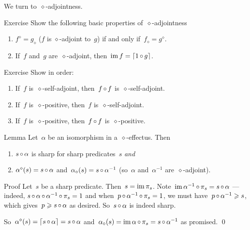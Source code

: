\documentclass[b]{subfiles}
\begin{document}
\begin{parsec}%
\begin{point}%
We turn to~$\diamond$-adjointness.
\end{point}
\begin{point}{Exercise}%
Show the following basic properties of~$\diamond$-adjointness
\begin{enumerate}
    \item
$f^\diamond = g_\diamond$
    ($f$ is $\diamond$-adjoint to~$g$)
    if and only if~$f_\diamond = g^\diamond$.
    \item
If~$f$ and~$g$ are~$\diamond$-adjoint,
    then~$\operatorname{im} f = \left\lceil1 \mathop{\circ} g\right\rceil$.
\end{enumerate}
\end{point}
\begin{point}{Exercise}%
Show in order:
\begin{enumerate}
\item
If~$f$ is~$\diamond$-self-adjoint,
    then~$f \mathop{\circ} f$ is~$\diamond$-self-adjoint.
\item
If~$f$ is~$\diamond$-positive,
    then~$f$ is~$\diamond$-self-adjoint.
\item
If~$f$ is~$\diamond$-positive,
    then~$f \mathop{\circ} f$ is~$\diamond$-positive.
\end{enumerate}
\end{point}
\begin{point}{Lemma}%
Let~$\alpha$ be an isomorphism in a~$\diamond$-effectus.
Then
\begin{enumerate}
\item
    $s\mathop{\circ}\alpha$ is sharp for sharp predicates~$s$ \emph{and}
\item
    $\alpha^\diamond(s) = s \mathop{\circ} \alpha$
    and~$\alpha_\diamond(s) = s\mathop{\circ} \alpha^{-1}$
    (so~$\alpha$ and~$\alpha^{-1}$ are~$\diamond$-adjoint).
\end{enumerate}
\begin{point}{Proof}%
Let~$s$ be a sharp predicate. Then~$s = \operatorname{im} \pi_s$.
Note~$\operatorname{im} \alpha^{-1}\mathop{\circ} \pi_s = s \mathop{\circ} \alpha$
    --- indeed, $s \mathop{\circ} \alpha \mathop{\circ} \alpha^{-1} \mathop{\circ} \pi_s=1$
    and when~$p \mathop{\circ} \alpha^{-1} \mathop{\circ} \pi_s=1$,
    we must have~$p \mathop{\circ} \alpha^{-1} \geqslant s$,
    which gives~$p \geqslant s \mathop{\circ} \alpha$ as desired.
    So~$s \mathop{\circ} \alpha$ is indeed sharp.

So~$\alpha^\diamond(s) = \left\lceil s \mathop{\circ} \alpha\right\rceil = s\mathop{\circ} \alpha$
    and~$\alpha_\diamond(s) = \operatorname{im} \alpha \mathop{\circ} \pi_s = s \mathop{\circ} \alpha^{-1}$
    as promised. \qed
\end{point}
\end{point}
\end{parsec}
\end{document}
